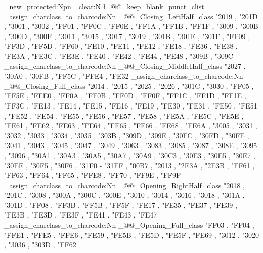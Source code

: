 \cs_new_protected:Npn \ChineseSimplifiedH
  {
    \clist_clear:N \l_@@_keep_blank_punct_clist
    \@@_assign_charclass_to_charcode:Nn \g_@@_Closing_LeftHalf_class
      {
        "2019 , "201D ,
        "3001 , "3002 , "FF01 , "FF0C , "FF0E ,
        "FF1A , "FF1B , "FF1F ,
        "3009 , "300B , "300D , "300F , "3011 ,
        "3015 , "3017 , "3019 , "301B , "301E ,
        "301F , "FF09 , "FF3D , "FF5D , "FF60 ,
        "FE10 , "FE11 , "FE12 ,
        "FE18 , "FE36 , "FE38 , "FE3A , "FE3C ,
        "FE3E , "FE40 , "FE42 , "FE44 , "FE48 ,
        "309B , "309C
      }
    \@@_assign_charclass_to_charcode:Nn \g_@@_Closing_MiddleHalf_class
      {
        "2027 ,
        "30A0 , "30FB ,
        "FF5C , "FFE4 ,
        "FE32
      }
    \@@_assign_charclass_to_charcode:Nn \g_@@_Closing_Full_class
      {
        "2014 , "2015 , "2025 , "2026 ,
        "301C , "3030 , "FF05 , "FF5E , "FFE0 ,
        "FF0A , "FF0B , "FF0D , "FF0F ,
        "FF1C , "FF1D , "FF1E , "FF3C ,
        "FE13 ,
        "FE14 , "FE15 , "FE16 , "FE19 , "FE30 ,
        "FE31 ,
        "FE50 , "FE51 , "FE52 , "FE54 , "FE55 ,
        "FE56 , "FE57 , "FE58 , "FE5A , "FE5C ,
        "FE5E , "FE61 , "FE62 , "FE63 , "FE64 ,
        "FE65 , "FE66 , "FE68 , "FE6A ,
        "3005 , "3031 , "3032 , "3033 , "3034 ,
        "3035 , "303B , "309D , "309E , "30FC ,
        "30FD , "30FE ,
        "3041 , "3043 , "3045 , "3047 , "3049 ,
        "3063 , "3083 , "3085 , "3087 , "308E ,
        "3095 , "3096 ,
        "30A1 , "30A3 , "30A5 , "30A7 , "30A9 ,
        "30C3 , "30E3 , "30E5 , "30E7 , "30EE ,
        "30F5 , "30F6 ,
        "31F0 - "31FF ,
        "00B7 , "2013 , "2E3A , "2E3B ,
        "FF61 , "FF63 , "FF64 , "FF65 , "FFE8 ,
        "FF70 , "FF9E , "FF9F
      }
    \@@_assign_charclass_to_charcode:Nn \g_@@_Opening_RightHalf_class
      {
        "2018 , "201C ,
        "3008 , "300A , "300C , "300E , "3010 ,
        "3014 , "3016 , "3018 , "301A , "301D ,
        "FF08 , "FF3B , "FF5B , "FF5F ,
        "FE17 , "FE35 , "FE37 , "FE39 , "FE3B ,
        "FE3D , "FE3F , "FE41 , "FE43 , "FE47
      }
    \@@_assign_charclass_to_charcode:Nn \g_@@_Opening_Full_class
      {
        "FF03 , "FF04 , "FFE1 , "FFE5 , "FFE6 ,
        "FE59 , "FE5B , "FE5D , "FE5F , "FE69 ,
        "3012 , "3020 , "3036 , "303D ,
        "FF62
      }
  }
\ChineseSimplifiedH

